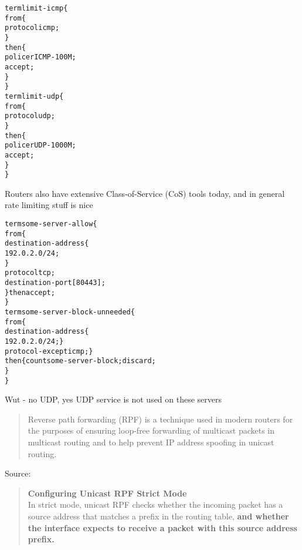 \documentclass[Screen16to9,17pt]{foils}
\begin{document}

\begin{alltt}\footnotesize
term limit-icmp \{
    from \{
        protocol icmp;
    \}
    then \{
        policer ICMP-100M;
        accept;
    \}
\}
term limit-udp \{
    from \{
        protocol udp;
    \}
    then \{
        policer UDP-1000M;
        accept;
    \}
\}
\end{alltt}

Routers also have extensive Class-of-Service (CoS) tools today, and in general rate limiting stuff is nice


\begin{alltt}\footnotesize
term some-server-allow \{
    from \{
        destination-address \{
            192.0.2.0/24;
        \}
        protocol tcp;
        destination-port [ 80 443 ];
    \} then accept;
\}
term some-server-block-unneeded \{
    from \{
        destination-address \{
            192.0.2.0/24; \}
        protocol-except icmp;  \}
    then \{ count some-server-block; discard;
    \}
\}
\end{alltt}

Wut - no UDP, yes UDP service is not used on these servers



\begin{quote}
Reverse path forwarding (RPF) is a technique used in modern routers for the purposes of ensuring loop-free forwarding of multicast packets in multicast routing and to help prevent IP address spoofing in unicast routing.
\end{quote}
Source: 

\begin{quote}
{\bf Configuring Unicast RPF Strict Mode}\\
In strict mode, unicast RPF checks whether the incoming packet has a source address that matches a prefix in the routing table, {\bf and whether the interface expects to receive a packet with this source address prefix.}
\end{quote}





\end{document}
